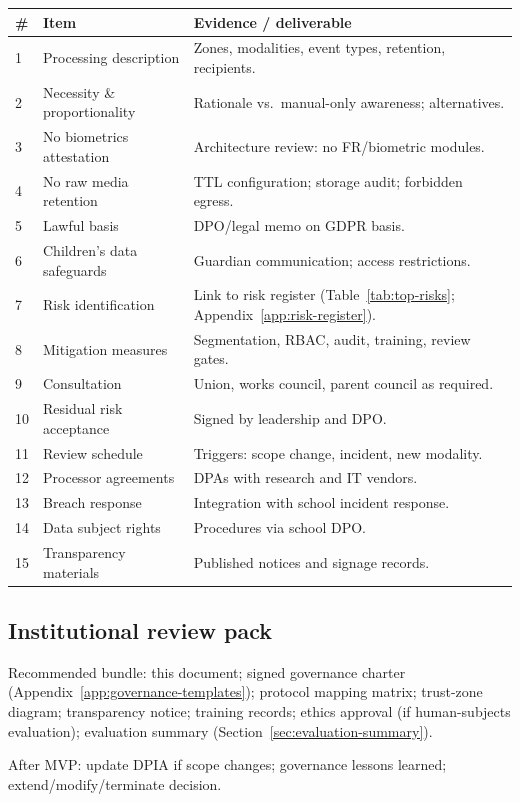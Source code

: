 \begin{longtable}{@{}p{0.5cm}p{4.8cm}p{6.5cm}@{}}
\toprule
\# & Item & Evidence / deliverable \\
\midrule
\endhead
1 & Processing description &
  Zones, modalities, event types, retention, recipients. \\
2 & Necessity \& proportionality &
  Rationale vs.\ manual-only awareness; alternatives. \\
3 & No biometrics attestation &
  Architecture review: no FR/biometric modules. \\
4 & No raw media retention &
  TTL configuration; storage audit; forbidden egress. \\
5 & Lawful basis &
  DPO/legal memo on GDPR basis. \\
6 & Children's data safeguards &
  Guardian communication; access restrictions. \\
7 & Risk identification &
  Link to risk register (Table~\ref{tab:top-risks}; Appendix~\ref{app:risk-register}). \\
8 & Mitigation measures &
  Segmentation, RBAC, audit, training, review gates. \\
9 & Consultation &
  Union, works council, parent council as required. \\
10 & Residual risk acceptance &
  Signed by leadership and DPO. \\
11 & Review schedule &
  Triggers: scope change, incident, new modality. \\
12 & Processor agreements &
  DPAs with research and IT vendors. \\
13 & Breach response &
  Integration with school incident response. \\
14 & Data subject rights &
  Procedures via school DPO. \\
15 & Transparency materials &
  Published notices and signage records. \\
\bottomrule
\end{longtable}

\subsection{Institutional review pack}

Recommended bundle: this document; signed governance charter (Appendix~\ref{app:governance-templates});
protocol mapping matrix; trust-zone diagram; transparency notice; training records; ethics approval
(if human-subjects evaluation); evaluation summary (Section~\ref{sec:evaluation-summary}).

After MVP: update DPIA if scope changes; governance lessons learned; extend/modify/terminate decision.
